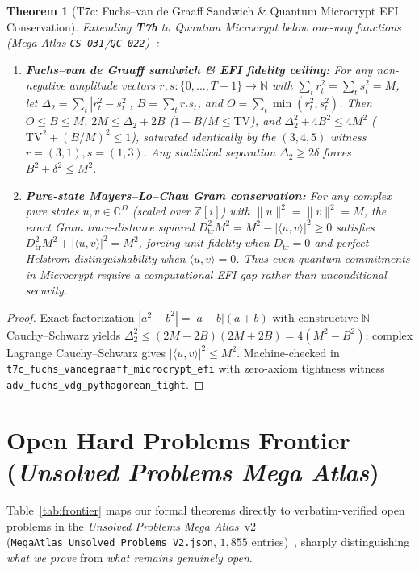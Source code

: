 \documentclass[11pt,reqno]{amsart}
\newtheorem{theorem}{Theorem}[section]
\theoremstyle{definition}
\newcommand{\Z}{\mathbb{Z}}
\newcommand{\code}[1]{\texttt{\small #1}}
\begin{document}
\begin{theorem}[T7c: Fuchs--van de Graaff Sandwich \& Quantum Microcrypt EFI Conservation]
\label{thm:t7c}
Extending \textbf{T7b} to Quantum Microcrypt below one-way functions (Mega Atlas \code{CS-031}/\code{QC-022})~\cite{fuchs1999,brakerski2023efi}:
\begin{enumerate}[leftmargin=1.8em]
  \item \textbf{Fuchs--van de Graaff sandwich \& EFI fidelity ceiling:} For any non-negative amplitude vectors $r, s : \{0,\dots,T-1\} \to \mathbb{N}$ with $\sum_t r_t^2 = \sum_t s_t^2 = M$, let $\Delta_2 = \sum_t |r_t^2 - s_t^2|$, $B = \sum_t r_t s_t$, and $O = \sum_t \min(r_t^2, s_t^2)$. Then $O \le B \le M$, $2M \le \Delta_2 + 2B$ ($1 - B/M \le \mathrm{TV}$), and $\Delta_2^2 + 4B^2 \le 4M^2$ ($\mathrm{TV}^2 + (B/M)^2 \le 1$), saturated identically by the $(3,4,5)$ witness $r=(3,1), s=(1,3)$. Any statistical separation $\Delta_2 \ge 2\delta$ forces $B^2 + \delta^2 \le M^2$.
  \item \textbf{Pure-state Mayers--Lo--Chau Gram conservation:} For any complex pure states $u, v \in \mathbb{C}^D$ (scaled over $\Z[i]$) with $\|u\|^2 = \|v\|^2 = M$, the exact Gram trace-distance squared $D_{\mathrm{tr}}^2 M^2 = M^2 - |\langle u, v \rangle|^2 \ge 0$ satisfies $D_{\mathrm{tr}}^2 M^2 + |\langle u, v \rangle|^2 = M^2$, forcing unit fidelity when $D_{\mathrm{tr}} = 0$ and perfect Helstrom distinguishability when $\langle u, v \rangle = 0$. Thus even quantum commitments in Microcrypt require a computational EFI gap rather than unconditional security.
\end{enumerate}
\end{theorem}
\begin{proof}
Exact factorization $|a^2-b^2| = |a-b|(a+b)$ with constructive $\mathbb{N}$ Cauchy--Schwarz yields $\Delta_2^2 \le (2M-2B)(2M+2B) = 4(M^2-B^2)$; complex Lagrange Cauchy--Schwarz gives $|\langle u,v\rangle|^2 \le M^2$. Machine-checked in \code{t7c\_fuchs\_vandegraaff\_microcrypt\_efi} with zero-axiom tightness witness \code{adv\_fuchs\_vdg\_pythagorean\_tight}.
\end{proof}

\section{Open Hard Problems Frontier (\emph{Unsolved Problems Mega Atlas})}
\label{sec:frontier}

Table~\ref{tab:frontier} maps our formal theorems directly to verbatim-verified open problems in the \emph{Unsolved Problems Mega Atlas}~v2 (\code{MegaAtlas\_Unsolved\_Problems\_V2.json}, $1{,}855$ entries)~\cite{mega_atlas_2026}, sharply distinguishing \emph{what we prove} from \emph{what remains genuinely open}.
\end{document}
